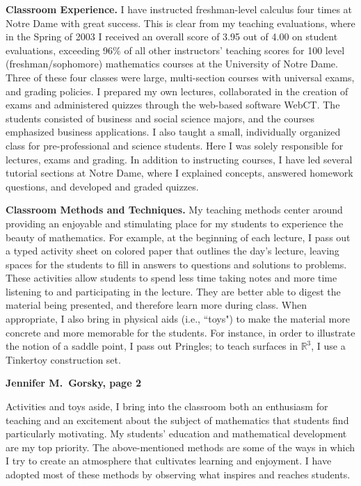 \documentclass[12pt]{article}
\begin{document}
{\bf Classroom Experience.}  I have instructed freshman-level calculus four
times at Notre Dame with great success.  This is clear from my teaching evaluations, where in the
Spring of 2003 I received an overall score of 
3.95 out of
4.00 on student evaluations, exceeding 96\% of all other instructors'
teaching scores for 100 level (freshman/sophomore) mathematics courses at
the University of Notre Dame. Three of these four classes were large,
multi-section courses with universal exams, and grading policies.  
I prepared my own lectures, collaborated in the creation of exams and
administered quizzes through the web-based software WebCT.  The
students consisted of business and social science majors, and the courses
emphasized business applications. I also taught a small, individually
organized class for pre-professional and science students.  Here I was
solely responsible for lectures, exams and grading.  In addition to
instructing courses, I have led several tutorial sections at Notre
Dame, where I explained concepts, answered homework questions, and
developed and graded quizzes.   



\vspace{0.1in}


{\bf Classroom Methods and Techniques.}  My teaching methods center
around providing an enjoyable and stimulating place for my students to
experience the beauty of mathematics.
For example, at the
beginning of each lecture, I pass out a typed activity sheet on colored
paper that outlines the day's lecture, leaving spaces for the students to
fill in answers to questions and solutions to problems.  These activities
allow students to spend less time taking notes and more time listening to
and participating in the lecture.  They are better able to digest the
material being presented, and therefore learn more during class.   When
appropriate, I also bring in physical aids (i.e., ``toys") to make the
material more concrete and more memorable for the students.  For instance,
in order to illustrate the notion of a saddle point, I pass out  Pringles;
to teach surfaces in $\mathbb{R}^3$, I use a Tinkertoy
construction
set.



 \newpage

{\bf Jennifer M.\ Gorsky, page 2}



\vskip 0.3in

\quad Activities and toys aside, I bring into the classroom both an
enthusiasm for teaching and an excitement about the subject of
mathematics that students find particularly motivating.  My
students' education and mathematical development are my top priority.  The
above-mentioned methods are some of the ways in which I try to create an
atmosphere that cultivates learning and enjoyment.  I have adopted most of
these methods by observing what inspires and reaches students.  
\end{document}
